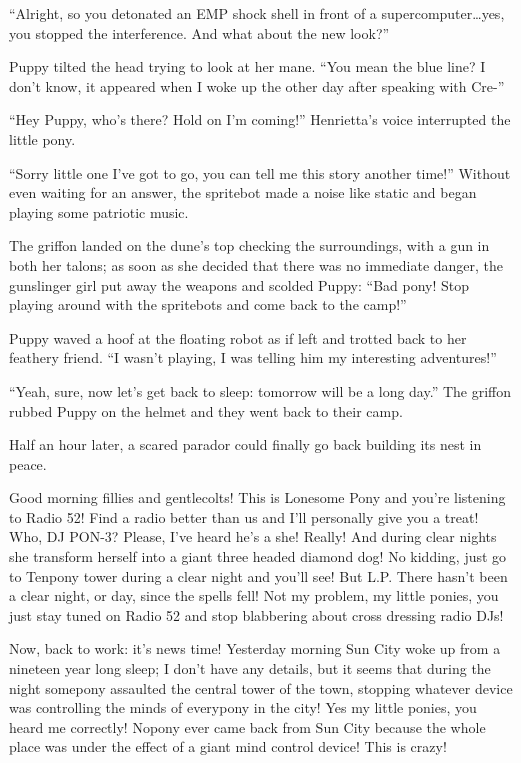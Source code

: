 ``Alright, so you detonated an EMP shock shell in front of a supercomputer\dots yes, you stopped the interference. And what about the new look?''

Puppy tilted the head trying to look at her mane. ``You mean the blue line? I don't know, it appeared when I woke up the other day after speaking with Cre-''

``Hey Puppy, who's there? Hold on I'm coming!'' Henrietta's voice interrupted the little pony.

``Sorry little one I've got to go, you can tell me this story another time!'' Without even waiting for an answer, the spritebot made a noise like static and began playing some patriotic music.

The griffon landed on the dune's top checking the surroundings, with a gun in both her talons; as soon as she decided that there was no immediate danger, the gunslinger girl put away the weapons and scolded Puppy: ``Bad pony! Stop playing around with the spritebots and come back to the camp!''

Puppy waved a hoof at the floating robot as if left and trotted back to her feathery friend. ``I wasn't playing, I was telling him my interesting adventures!''

``Yeah, sure, now let's get back to sleep: tomorrow will be a long day.'' The griffon rubbed Puppy on the helmet and they went back to their camp.

Half an hour later, a scared parador could finally go back building its nest in peace.

\horizonline

{\rt Good morning fillies and gentlecolts! This is Lonesome Pony and you're listening to Radio 52! Find a radio better than us and I'll personally give you a treat! Who, DJ PON-3? Please, I've heard he's a she! Really! And during clear nights she transform herself into a giant three headed diamond dog! No kidding, just go to Tenpony tower during a clear night and you'll see! But L.P. There hasn't been a clear night, or day, since the spells fell! Not my problem, my little ponies, you just stay tuned on Radio 52 and stop blabbering about cross dressing radio DJs!}

{\rt Now, back to work: it's news time! Yesterday morning Sun City woke up from a nineteen year long sleep; I don't have any details, but it seems that during the night somepony assaulted the central tower of the town, stopping whatever device was controlling the minds of everypony in the city! Yes my little ponies, you heard me correctly! Nopony ever came back from Sun City because the whole place was under the effect of a giant mind control device! This is crazy!}

